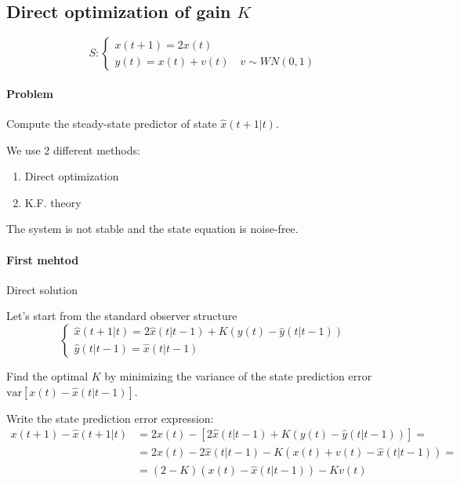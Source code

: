 
\subsection{Direct optimization of gain $K$}
\[
    S: \begin{cases}
        x(t+1) = 2x(t) \\
        y(t) = x(t) + v(t) \quad v \sim WN(0, 1)
    \end{cases}
\]

\paragraph{Problem} Compute the steady-state predictor of state $\hat{x}(t+1|t)$.

We use 2 different methods:
\begin{enumerate}
    \item Direct optimization
    \item K.F. theory
\end{enumerate}

\begin{rem}
    The system is not stable and the state equation is noise-free.
\end{rem}

\paragraph{First mehtod} Direct solution

Let's start from the standard observer structure
\[
    \begin{cases}
        \hat{x}(t+1|t) = 2\hat{x}(t|t-1) + K(y(t) - \hat{y}(t|t-1)) \\
        \hat{y}(t|t-1) = \hat{x}(t|t-1)
    \end{cases}
\]

Find the optimal $K$ by minimizing the variance of the state prediction error $\text{var}\left[x(t)-\hat{x}(t|t-1)\right]$.

Write the state prediction error expression:
\begin{align*}
    x(t+1) - \hat{x}(t+1|t) &= 2x(t) - \left[ 2\hat{x}(t|t-1) + K (y(t) - \hat{y}(t|t-1)) \right] =\\
    &= 2x(t) - 2\hat{x}(t|t-1) - K(x(t) + v(t) - \hat{x}(t|t-1)) = \\
    &= (2-K)(x(t) - \hat{x}(t|t-1)) - Kv(t)
\end{align*}

